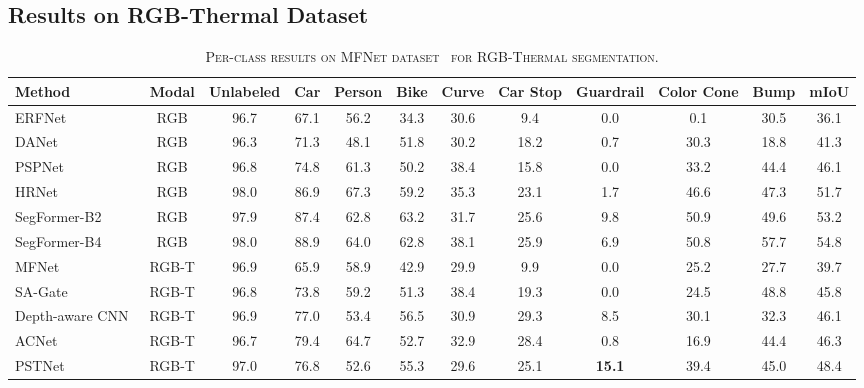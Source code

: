 \documentclass[journal]{IEEEtran}
\begin{document}
\subsection{Results on RGB-Thermal Dataset}
\label{sec:results_rgbt}

\begin{table*}[!t]
\begin{center}
        \caption{\textsc{Per-class results on MFNet dataset~\cite{ha2017mfnet} for RGB-Thermal segmentation.}}
        \label{tab:rgbt_sota_result}
        \begin{tabular}{ l | c | c c c c c c c c c | c }
    \toprule[1pt]
    \textbf{Method} & \textbf{Modal} & \textbf{Unlabeled} & \textbf{Car} & \textbf{Person} & \textbf{Bike} & \textbf{Curve} & \textbf{Car Stop} & \textbf{Guardrail} & \textbf{Color Cone} & \textbf{Bump} & \textbf{mIoU} \\
    \midrule\midrule
    ERFNet~\cite{romera2018erfnet} & RGB & 96.7 & 67.1 & 56.2 & 34.3 & 30.6 & 9.4 & 0.0 & 0.1 & 30.5 & 36.1 \\
    DANet~\cite{fu2019danet} & RGB & 96.3 & 71.3 & 48.1 & 51.8 & 30.2 & 18.2 & 0.7 & 30.3 & 18.8 & 41.3 \\
    PSPNet~\cite{zhao2017pspnet} & RGB & 96.8 & 74.8 & 61.3 & 50.2 & 38.4 & 15.8 & 0.0 & 33.2 & 44.4 & 46.1\\ 
    HRNet~\cite{wang2020hrnet} & RGB & 98.0 & 86.9 & 67.3 & 59.2 & 35.3 & 23.1 & 1.7 & 46.6 & 47.3 & 51.7 \\
    SegFormer-B2~\cite{xie2021segformer} & RGB & 97.9 & 87.4 & 62.8 & 63.2 & 31.7 & 25.6 & 9.8 & 50.9 & 49.6 & 53.2 \\
    SegFormer-B4~\cite{xie2021segformer} & RGB & 98.0 & 88.9 & 64.0 & 62.8 & 38.1 & 25.9 & 6.9 & 50.8 & 57.7 & 54.8 \\
    \midrule
    MFNet~\cite{ha2017mfnet} & RGB-T & 96.9 & 65.9 & 58.9 & 42.9 & 29.9 & 9.9 & 0.0 & 25.2 & 27.7 & 39.7 \\
    SA-Gate~\cite{chen2020sa_gate}& RGB-T & 96.8 & 73.8 & 59.2 & 51.3 & 38.4 & 19.3 & 0.0 & 24.5 & 48.8 & 45.8\\
    Depth-aware CNN~\cite{wang2018depth_aware} & RGB-T & 96.9 & 77.0 & 53.4 & 56.5 & 30.9 & 29.3 & 8.5 & 30.1 & 32.3 & 46.1 \\
    ACNet~\cite{hu2019acnet} & RGB-T & 96.7 & 79.4 & 64.7 & 52.7 & 32.9 & 28.4 & 0.8 & 16.9 & 44.4 & 46.3\\
    PSTNet~\cite{shivakumar2020pst900} & RGB-T & 97.0 & 76.8 & 52.6 & 55.3 & 29.6 & 25.1 & \textbf{15.1} & 39.4 & 45.0 & 48.4 \\

\end{tabular}
\end{center}
\end{table*}
\end{document}
